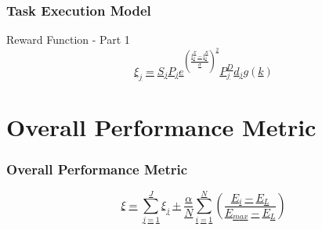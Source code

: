 \documentclass[10pt]{beamer}
\title[Progress]{\color{white}{\Large Project Progress}}
\author[Carlos Padilla,]{\normalsize Carlos Padilla} %
\institute[]{\small ICN, UNAM}
\date{\today}
\begin{document}
\maketitle


\begin{frame}
  \frametitle{Task Execution Model}
  \centering
  \vfill
  \centering
\end{frame}

\begin{frame}{Reward Function - Part 1}
  \href{https://www.overleaf.com/4694553851qmxvfhgchkkd#eea74e}{
  \begin{equation*}
    \xi_j = S_j P_j e^{\left(\frac{t_{j}^{E}-t_{j}^{R}}{\sigma}\right)^2} P_j^D d_j g(k)
  \end{equation*}}
\end{frame}

\section{Overall Performance Metric}

\begin{frame}
  \frametitle{Overall Performance Metric}
  \href{https://www.overleaf.com/4694553851qmxvfhgchkkd#eea74e}{
  \begin{equation*}
    \mathcal{\xi} = \sum_{j=1}^{J} \mathcal{\xi}_j + \frac{\alpha}{N} \sum_{i=1}^{N} \left( \frac{E_i - E_L}{E_{max} - E_L} \right)
  \end{equation*}}
\end{frame}
\end{document}
